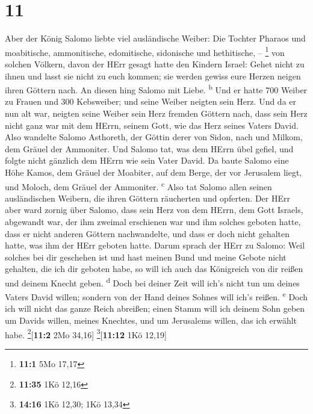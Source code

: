 \hypertarget{section-10}{%
\section{11}\label{section-10}}

 Aber der König Salomo liebte viel ausländische Weiber:
Die Tochter Pharaos und moabitische, ammonitische, edomitische,
sidonische und hethitische, -- \footnote{\textbf{11:1} 5Mo 17,17}
 von solchen Völkern, davon der HErr gesagt hatte den
Kindern Israel: Gehet nicht zu ihnen und lasst sie nicht zu euch kommen;
sie werden gewiss eure Herzen neigen ihren Göttern nach. An diesen hing
Salomo mit Liebe. \textsuperscript{b}  Und er hatte 700
Weiber zu Frauen und 300 Kebsweiber; und seine Weiber neigten sein Herz.
 Und da er nun alt war, neigten seine Weiber sein Herz
fremden Göttern nach, dass sein Herz nicht ganz war mit dem HErrn,
seinem Gott, wie das Herz seines Vaters David.  Also
wandelte Salomo Asthoreth, der Göttin derer von Sidon, nach und Milkom,
dem Gräuel der Ammoniter.  Und Salomo tat, was dem HErrn
übel gefiel, und folgte nicht gänzlich dem HErrn wie sein Vater David.
 Da baute Salomo eine Höhe Kamos, dem Gräuel der Moabiter,
auf dem Berge, der vor Jerusalem liegt, und Moloch, dem Gräuel der
Ammoniter. \textsuperscript{c}  Also tat Salomo allen
seinen ausländischen Weibern, die ihren Göttern räucherten und opferten.
 Der HErr aber ward zornig über Salomo, dass sein Herz von
dem HErrn, dem Gott Israels, abgewandt war, der ihm zweimal erschienen
war  und ihm solches geboten hatte, dass er nicht anderen
Göttern nachwandelte, und dass er doch nicht gehalten hatte, was ihm der
HErr geboten hatte.  Darum sprach der HErr zu Salomo:
Weil solches bei dir geschehen ist und hast meinen Bund und meine Gebote
nicht gehalten, die ich dir geboten habe, so will ich auch das
Königreich von dir reißen und deinem Knecht geben. \textsuperscript{d}
 Doch bei deiner Zeit will ich's nicht tun um deines
Vaters David willen; sondern von der Hand deines Sohnes will ich's
reißen. \textsuperscript{e}  Doch ich will nicht das
ganze Reich abreißen; einen Stamm will ich deinem Sohn geben um Davids
willen, meines Knechtes, und um Jerusalems willen, das ich erwählt habe.
\footnote{\textbf{11:35} 1Kö 12,16}{[}\textbf{11:2} 2Mo 34,16{]}
\footnote{\textbf{14:16} 1Kö 12,30; 1Kö 13,34}{[}\textbf{11:12} 1Kö
12,19{]}

